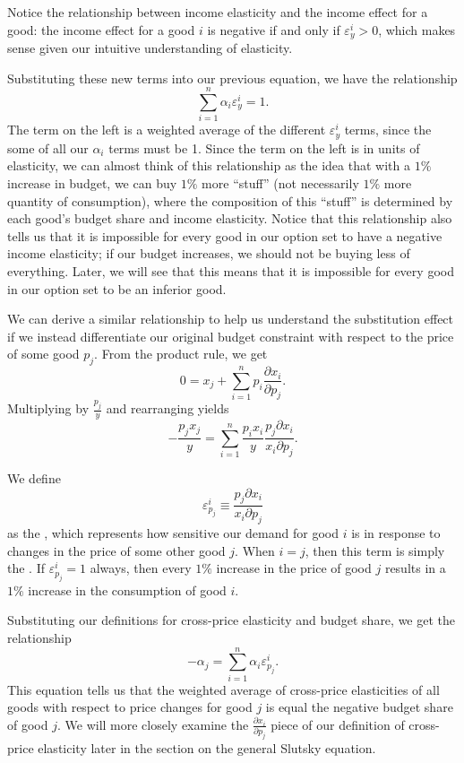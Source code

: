 Notice the relationship between income elasticity and the income effect for a good: the income effect for a good $i$ is negative if and only if $\varepsilon_y^i > 0$, which makes sense given our intuitive understanding of elasticity.

Substituting these new terms into our previous equation, we have the relationship
$$
\sum_{i=1}^{n} \alpha_{i} \varepsilon_{y}^{i} = 1.
$$
The term on the left is a weighted average of the different $\varepsilon_{y}^{i}$ terms, since the some of all our $\alpha_i$ terms must be 1. Since the term on the left is in units of elasticity, we can almost think of this relationship as the idea that with a $1\%$ increase in budget, we can buy $1\%$ more ``stuff'' (not necessarily $1\%$ more quantity of consumption), where the composition of this ``stuff'' is determined by each good's budget share and income elasticity.  Notice that this relationship also tells us that it is impossible for every good in our option set to have a negative income elasticity; if our budget increases, we should not be buying less of everything. Later, we will see that this means that it is impossible for every good in our option set to be an inferior good.

We can derive a similar relationship to help us understand the substitution effect if we instead differentiate our original budget constraint with respect to the price of some good $p_j$. From the product rule, we get
$$
0=x_{j}+\sum_{i=1}^{n} p_{i} \frac{\partial x_{i}}{\partial p_{j}}.
$$
Multiplying by $\frac{p_j}{y}$ and rearranging yields 
$$
-\frac{p_{j} x_{j}}{y}=\sum_{i=1}^{n} \frac{p_{i} x_{i}}{y} \frac{p_{j} \partial x_{i}}{x_{i} \partial p_{j}}.
$$

We define 
$$\varepsilon_{p_j}^i \equiv \frac{p_j \partial x_{i}}{x_{i} \partial p_j}$$
as the , which represents how sensitive our demand for good $i$ is in response to changes in the price of some other good $j$. When $i=j$, then this term is simply the . If $\varepsilon_{p_j}^i = 1$ always, then every $1\%$ increase in the price of good $j$ results in a $1\%$ increase in the consumption of good $i$.

Substituting our definitions for cross-price elasticity and budget share, we get the relationship
$$
-\alpha_{j}=\sum_{i=1}^{n} \alpha_{i} \varepsilon_{p_{j}}^{i}.
$$
This equation tells us that the weighted average of cross-price elasticities of all goods with respect to price changes for good $j$ is equal the negative budget share of good $j$. We will more closely examine the $\frac{\partial x_{i}}{\partial p_j}$ piece of our definition of cross-price elasticity later in the section on the general Slutsky equation.

